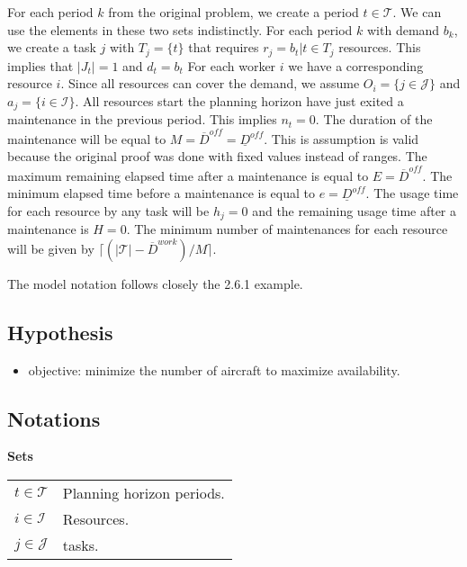 \documentclass[a4paper,11pt]{article}
\begin{document}
    For each period $k$ from the original problem, we create a period $t \in \mathcal{T}$. We can use the elements in these two sets indistinctly.
    For each period $k$ with demand $b_{k}$, we create a task $j$ with $T_j = \{t\}$ that requires $r_{j} = b_{t}| t \in T_j$ resources. This implies that $|J_t| = 1$ and $d_t = b_{t}$
    For each worker $i$ we have a corresponding resource $i$.
    Since all resources can cover the demand, we assume $O_i = \{j \in \mathcal{J}\}$ and $a_{j} = \{i \in \mathcal{I}\}$.
    All resources start the planning horizon have just exited a maintenance in the previous period. This implies $n_t = 0$.
    The duration of the maintenance will be equal to $M = \overline{D}^{off} = \underline{D}^{off}$. This is assumption is valid because the original proof was done with fixed values instead of ranges.
    The maximum remaining elapsed time after a maintenance is equal to $E = \overline{D}^{off}$. The minimum elapsed time before a maintenance is equal to $e=\underline{D}^{off}$.
    The usage time for each resource by any task will be $h_j = 0$ and the remaining usage time after a maintenance is $H = 0$. The minimum number of maintenances for each resource will be given by $\lceil(|\mathcal{T}| - \overline{D}^{work}) / M \rceil$.

    The model notation follows closely the \cite{Smet2015} 2.6.1 example.

    \subsection{Hypothesis}

    \begin{itemize}
         \item objective: minimize the number of aircraft to maximize availability.
    \end{itemize}

    \subsection{Notations}

    \textbf{Sets}

    \begin{tabular}{ll}
        $t \in \mathcal{T}$ & Planning horizon periods. \\
        $i \in \mathcal{I}$ & Resources. \\
        $j \in \mathcal{J}$ & tasks. 
    \end{tabular}
\end{document}
